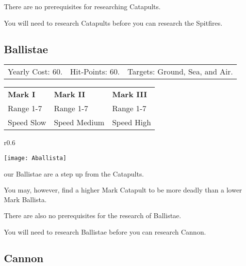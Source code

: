 There are no prerequisites for researching Catapults. 

You will need to research Catapults before you can research the Spitfires.

\clearpage  %

\subsection{\textsf{Ballistae}}


\begin{tabular}{p{1.264in} p{1.264in} p{1.264in}}
    Yearly Cost: 60. & Hit-Points: 60. & Targets: Ground, Sea, and Air.
\end{tabular}

\begin{tabular}{|p{1.264in} p{1.264in} p{1.264in}|}
    \hline
    \textbf{Mark I}    & \textbf{Mark II} & \textbf{Mark III} \\ 
    Range 1-7 & Range 1-7& Range 1-7 \\ 
    Speed Slow & Speed Medium & Speed High \\ 
    \hline
\end{tabular}

\begin{wrapfigure}{r}{0.6\textwidth}
    \vspace{-20pt}
    \begin{center}
        \texttt{[image: Aballista]} %
    \end{center}
    \vspace{-20pt}
\end{wrapfigure}

our Ballistae are a step up from the Catapults.

You may, however, find a higher Mark Catapult to be more deadly than a lower Mark Ballista.

There are also no prerequisites for the research of Ballistae.

You will need to research Ballistae before you can research Cannon.

\clearpage  %

\subsection{\textsf{Cannon}}


